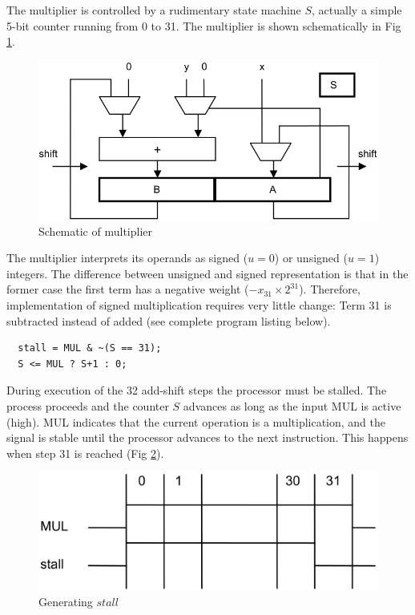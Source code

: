 The multiplier is controlled by a rudimentary state machine $S$, actually a simple 5-bit counter
running from 0 to 31. The multiplier is shown schematically in Fig \ref{fig:multiplier}.

\begin{figure}[h!]
	\centering
	\includegraphics[width=.9\textwidth]{i/F/3.png}
	\caption{Schematic of multiplier}
	\label{fig:multiplier}
\end{figure}

The multiplier interprets its operands as signed ($u = 0$) or unsigned ($u = 1$) integers. The difference
between unsigned and signed representation is that in the former case the first term has a
negative weight ($-x_{31}×2^{31}$). Therefore, implementation of signed multiplication requires very little
change: Term 31 is subtracted instead of added (see complete program listing below).

\begin{verbatim}
  stall = MUL & ~(S == 31);
  S <= MUL ? S+1 : 0;
\end{verbatim}

During execution of the 32 add-shift steps the processor must be stalled. The process proceeds
and the counter $S$ advances as long as the input MUL is active (high). MUL indicates that the
current operation is a multiplication, and the signal is stable until the processor advances to the
next instruction. This happens when step 31 is reached (Fig \ref{fig:stall}).

\begin{figure}[h!]
	\centering
	\includegraphics[width=.9\textwidth]{i/F/4.png}
	\caption{Generating $stall$}
	\label{fig:stall}
\end{figure}

